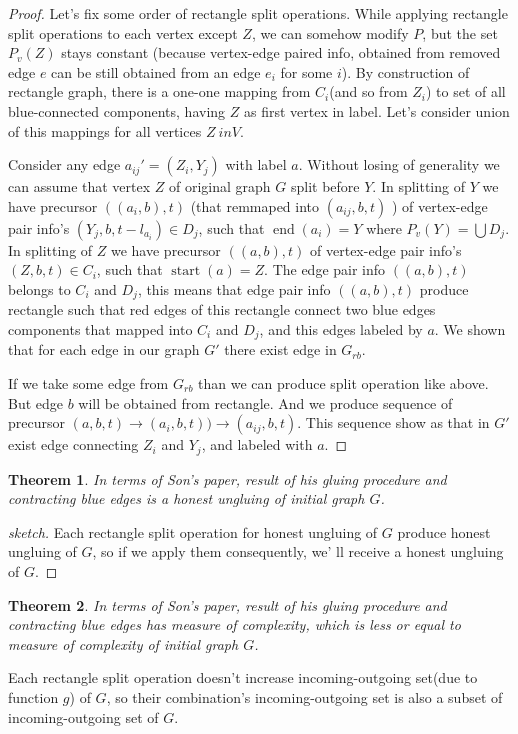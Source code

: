 \documentclass[12pt,a4paper,oneside]{article}
\newtheorem{theorem}{Theorem}
\begin{document}
\begin{proof}
Let's fix some order of rectangle split operations.
While applying rectangle split operations to each vertex except $Z$, we can somehow modify $P$, but the set $P_v(Z)$ stays constant (because vertex-edge paired info, obtained from removed edge $e$ can be still obtained from an edge $e_i$ for some $i$). By construction of rectangle graph, there is a one-one mapping from $C_i$(and so from $Z_i$) to set of all blue-connected components, having $Z$ as first vertex in label. Let's consider union of this mappings for all vertices $Z \ in V$. 

Consider any edge $a_{ij}'=(Z_i, Y_j)$ with label $a$. 
Without losing of generality we can assume that vertex $Z$ of original graph $G$ split before $Y$. In splitting of $Y$ we have precursor $((a_{i}, b), t)$ (that remmaped into $(a_{ij}, b, t)$ ) of vertex-edge pair info's $(Y_j, b, t-l_{a_i}) \in D_j$, such that $\mathop{end}(a_{i}) = Y$ where $P_v(Y) = \bigcup D_j$. In splitting of $Z$ we have precursor $((a, b), t)$ of vertex-edge pair info's $(Z, b, t) \in C_i$, such that $\mathop{start}(a) = Z$. The edge pair info $((a, b), t)$ belongs to $C_i$ and $D_j$, this means that edge pair info $((a, b), t)$ produce rectangle such that red edges of this rectangle connect two blue edges  components that mapped into $C_i$ and $D_j$, and this edges labeled by $a$. We shown that for each edge in our graph $G'$ there exist edge in $G_{rb}$.

If we take some edge from $G_{rb}$ than we can produce split operation like above. But edge $b$ will be obtained from rectangle. And we produce sequence of precursor $(a,b,t)\rightarrow (a_i,b,t))\rightarrow (a_{ij},b,t)$. This sequence show as that in $G'$ exist edge connecting $Z_i$ and $Y_j$, and labeled with $a$. 
\end{proof}



\begin{theorem}
  In terms of Son's paper, result of his gluing procedure and contracting blue edges is a honest ungluing of initial graph $G$. 
\end{theorem}
\begin{proof}[sketch]
Each rectangle split operation for honest ungluing of $G$ produce honest ungluing of $G$, so if we apply them consequently, we'
ll receive a honest ungluing of $G$.
\end{proof}
\begin{theorem}
  In terms of Son's paper, result of his gluing procedure and contracting blue edges has measure of complexity, which is less or equal to measure of complexity of initial graph $G$. 
\end{theorem}
Each rectangle split operation  doesn't increase incoming-outgoing set(due to function $g$) of $G$, so their combination's incoming-outgoing set is also a subset of incoming-outgoing set of $G$.
\end{document}
